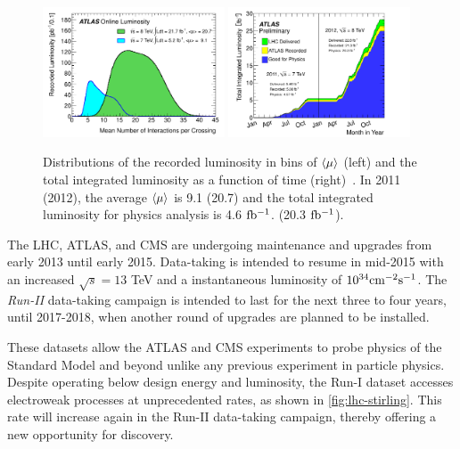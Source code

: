 \begin{figure}[tp]
  \centering
  \includegraphics[width=0.48\textwidth]{figures/lhc-atlas/mu_2011_2012-dec}
  \includegraphics[width=0.48\textwidth]{figures/lhc-atlas/intlumivstime2011-2012DQ}
  \caption{Distributions of the recorded luminosity in bins of $\langle\mu\rangle$ (left) and the total integrated luminosity as a function of time (right)~\cite{atlas-lumi}. In 2011 (2012), the average $\langle\mu\rangle$ is 9.1 (20.7) and the total integrated luminosity for physics analysis is 4.6 $\mbox{fb$^{-1}$}$. (20.3 $\mbox{fb$^{-1}$}$).}
  \label{fig:atlas-lumi-2}
\end{figure}

The LHC, ATLAS, and CMS are undergoing maintenance and upgrades from early 2013 until early 2015. Data-taking is intended to resume in mid-2015 with an increased $\sqrt{s}=13$ TeV and a instantaneous luminosity of $10^{34}\text{cm}^{-2} \text{s}^{-1}$. The \textit{Run-II} data-taking campaign is intended to last for the next three to four years, until 2017-2018, when another round of upgrades are planned to be installed.

These datasets allow the ATLAS and CMS experiments to probe physics of the Standard Model and beyond unlike any previous experiment in particle physics. Despite operating below design energy and luminosity, the Run-I dataset accesses electroweak processes at unprecedented rates, as shown in \cref{fig:lhc-stirling}. This rate will increase again in the Run-II data-taking campaign, thereby offering a new opportunity for discovery.

